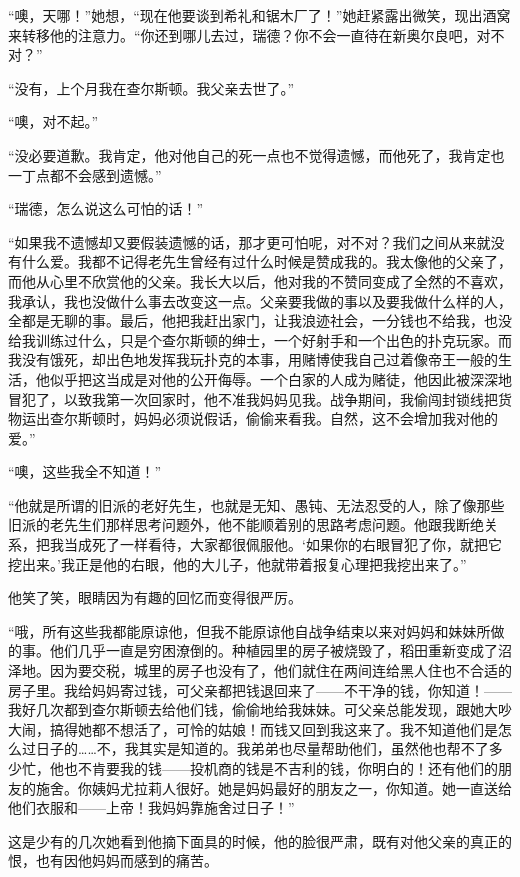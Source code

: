 \par “噢，天哪！”她想，“现在他要谈到希礼和锯木厂了！”她赶紧露出微笑，现出酒窝来转移他的注意力。“你还到哪儿去过，瑞德？你不会一直待在新奥尔良吧，对不对？”
\par “没有，上个月我在查尔斯顿。我父亲去世了。”
\par “噢，对不起。”
\par “没必要道歉。我肯定，他对他自己的死一点也不觉得遗憾，而他死了，我肯定也一丁点都不会感到遗憾。”
\par “瑞德，怎么说这么可怕的话！”
\par “如果我不遗憾却又要假装遗憾的话，那才更可怕呢，对不对？我们之间从来就没有什么爱。我都不记得老先生曾经有过什么时候是赞成我的。我太像他的父亲了，而他从心里不欣赏他的父亲。我长大以后，他对我的不赞同变成了全然的不喜欢，我承认，我也没做什么事去改变这一点。父亲要我做的事以及要我做什么样的人，全都是无聊的事。最后，他把我赶出家门，让我浪迹社会，一分钱也不给我，也没给我训练过什么，只是个查尔斯顿的绅士，一个好射手和一个出色的扑克玩家。而我没有饿死，却出色地发挥我玩扑克的本事，用赌博使我自己过着像帝王一般的生活，他似乎把这当成是对他的公开侮辱。一个白家的人成为赌徒，他因此被深深地冒犯了，以致我第一次回家时，他不准我妈妈见我。战争期间，我偷闯封锁线把货物运出查尔斯顿时，妈妈必须说假话，偷偷来看我。自然，这不会增加我对他的爱。”
\par “噢，这些我全不知道！”
\par “他就是所谓的旧派的老好先生，也就是无知、愚钝、无法忍受的人，除了像那些旧派的老先生们那样思考问题外，他不能顺着别的思路考虑问题。他跟我断绝关系，把我当成死了一样看待，大家都很佩服他。‘如果你的右眼冒犯了你，就把它挖出来。’我正是他的右眼，他的大儿子，他就带着报复心理把我挖出来了。”
\par 他笑了笑，眼睛因为有趣的回忆而变得很严厉。
\par “哦，所有这些我都能原谅他，但我不能原谅他自战争结束以来对妈妈和妹妹所做的事。他们几乎一直是穷困潦倒的。种植园里的房子被烧毁了，稻田重新变成了沼泽地。因为要交税，城里的房子也没有了，他们就住在两间连给黑人住也不合适的房子里。我给妈妈寄过钱，可父亲都把钱退回来了——不干净的钱，你知道！——我好几次都到查尔斯顿去给他们钱，偷偷地给我妹妹。可父亲总能发现，跟她大吵大闹，搞得她都不想活了，可怜的姑娘！而钱又回到我这来了。我不知道他们是怎么过日子的……不，我其实是知道的。我弟弟也尽量帮助他们，虽然他也帮不了多少忙，他也不肯要我的钱——投机商的钱是不吉利的钱，你明白的！还有他们的朋友的施舍。你姨妈尤拉莉人很好。她是妈妈最好的朋友之一，你知道。她一直送给他们衣服和——上帝！我妈妈靠施舍过日子！”
\par 这是少有的几次她看到他摘下面具的时候，他的脸很严肃，既有对他父亲的真正的恨，也有因他妈妈而感到的痛苦。

